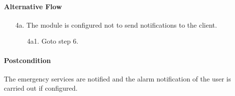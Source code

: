 \paragraph{Alternative Flow}
\begin{enumerate}
	\item[4a.] The module is configured not to send notifications to the client.  
	\begin{enumerate}
		\item[4a1.] Goto step 6.
	\end{enumerate}
\end{enumerate}

\paragraph{Postcondition}
The emergency services are notified and the alarm notification of the user is carried out if configured.
